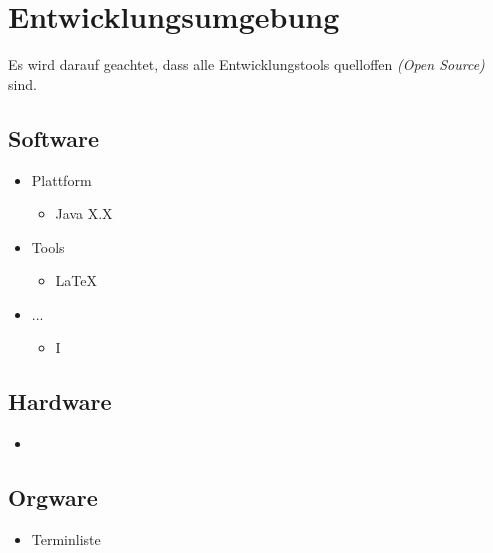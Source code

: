 \section{Entwicklungsumgebung}

Es wird darauf geachtet, dass alle Entwicklungstools quelloffen \textit{(Open Source)} sind.

\subsection{Software}

\begin{itemize}
  \item Plattform
    \begin{itemize}
      \item Java X.X
    \end{itemize}
  \item Tools
    \begin{itemize}
      \item \LaTeX
    \end{itemize}
  \item ...
    \begin{itemize}
      \item I
    \end{itemize}
\end{itemize}

\subsection{Hardware}

\begin{itemize}
  \item
\end{itemize}

\subsection{Orgware}

\begin{itemize}
  \item Terminliste
\end{itemize}
